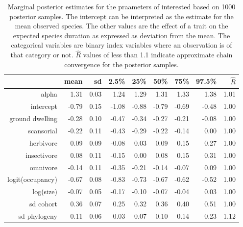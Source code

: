 \begin{table}[c]
  \centering
  \caption{Marginal posterior estimates for the praameters of interested based on 1000 posterior samples. The intercept can be interpreted as the estimate for the mean observed species. The other values are the effect of a trait on the expected species duration as expressed as deviation from the mean. The categorical variables are binary index variables where an observation is of that category or not. \(\hat{R}\) values of less than 1.1 indicate approximate chain convergence for the posterior samples.}
  \begin{tabular}{rrrrrrrrr}
    \hline
    & mean & sd & 2.5\% & 25\% & 50\% & 75\% & 97.5\% & \(\hat{R}\) \\ 
    \hline
    \hline
    alpha & 1.31 & 0.03 & 1.24 & 1.29 & 1.31 & 1.33 & 1.38 & 1.01 \\ 
    \hline
    intercept & -0.79 & 0.15 & -1.08 & -0.88 & -0.79 & -0.69 & -0.48 & 1.00 \\ 
    ground dwelling & -0.28 & 0.10 & -0.47 & -0.34 & -0.27 & -0.21 & -0.08 & 1.00 \\ 
    scansorial & -0.22 & 0.11 & -0.43 & -0.29 & -0.22 & -0.14 & 0.00 & 1.00 \\ 
    herbivore & 0.09 & 0.09 & -0.08 & 0.03 & 0.09 & 0.15 & 0.27 & 1.00 \\ 
    insectivore & 0.08 & 0.11 & -0.15 & 0.00 & 0.08 & 0.15 & 0.31 & 1.00 \\ 
    omnivore & -0.14 & 0.11 & -0.35 & -0.21 & -0.14 & -0.07 & 0.09 & 1.00 \\ 
    logit(occupancy) & -0.67 & 0.08 & -0.83 & -0.73 & -0.67 & -0.62 & -0.52 & 1.00 \\ 
    log(size) & -0.07 & 0.05 & -0.17 & -0.10 & -0.07 & -0.04 & 0.03 & 1.00 \\ 
    \hline
    sd cohort & 0.36 & 0.07 & 0.25 & 0.32 & 0.36 & 0.40 & 0.51 & 1.00 \\ 
    sd phylogeny & 0.11 & 0.06 & 0.03 & 0.07 & 0.10 & 0.14 & 0.23 & 1.12 \\ 
    \hline
  \end{tabular}
  \label{tab:post_sum}
\end{table}
